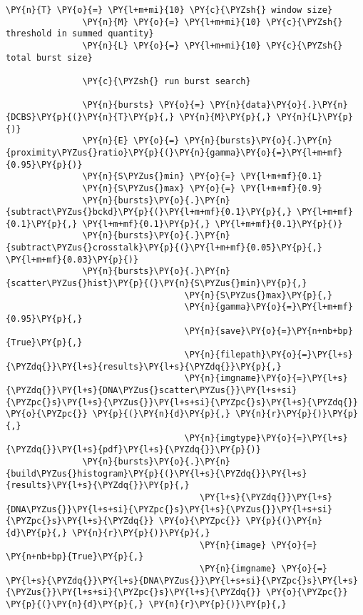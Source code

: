 \begin{Verbatim}[commandchars=\\\{\}, fontsize=\scriptsize]
               \PY{n}{T} \PY{o}{=} \PY{l+m+mi}{10} \PY{c}{\PYZsh{} window size}
               \PY{n}{M} \PY{o}{=} \PY{l+m+mi}{10} \PY{c}{\PYZsh{} threshold in summed quantity}
               \PY{n}{L} \PY{o}{=} \PY{l+m+mi}{10} \PY{c}{\PYZsh{} total burst size}
                   
               \PY{c}{\PYZsh{} run burst search}
       
               \PY{n}{bursts} \PY{o}{=} \PY{n}{data}\PY{o}{.}\PY{n}{DCBS}\PY{p}{(}\PY{n}{T}\PY{p}{,} \PY{n}{M}\PY{p}{,} \PY{n}{L}\PY{p}{)}
               \PY{n}{E} \PY{o}{=} \PY{n}{bursts}\PY{o}{.}\PY{n}{proximity\PYZus{}ratio}\PY{p}{(}\PY{n}{gamma}\PY{o}{=}\PY{l+m+mf}{0.95}\PY{p}{)}
               \PY{n}{S\PYZus{}min} \PY{o}{=} \PY{l+m+mf}{0.1}
               \PY{n}{S\PYZus{}max} \PY{o}{=} \PY{l+m+mf}{0.9}
               \PY{n}{bursts}\PY{o}{.}\PY{n}{subtract\PYZus{}bckd}\PY{p}{(}\PY{l+m+mf}{0.1}\PY{p}{,} \PY{l+m+mf}{0.1}\PY{p}{,} \PY{l+m+mf}{0.1}\PY{p}{,} \PY{l+m+mf}{0.1}\PY{p}{)}
               \PY{n}{bursts}\PY{o}{.}\PY{n}{subtract\PYZus{}crosstalk}\PY{p}{(}\PY{l+m+mf}{0.05}\PY{p}{,} \PY{l+m+mf}{0.03}\PY{p}{)}
               \PY{n}{bursts}\PY{o}{.}\PY{n}{scatter\PYZus{}hist}\PY{p}{(}\PY{n}{S\PYZus{}min}\PY{p}{,} 
                                   \PY{n}{S\PYZus{}max}\PY{p}{,} 
                                   \PY{n}{gamma}\PY{o}{=}\PY{l+m+mf}{0.95}\PY{p}{,} 
                                   \PY{n}{save}\PY{o}{=}\PY{n+nb+bp}{True}\PY{p}{,} 
                                   \PY{n}{filepath}\PY{o}{=}\PY{l+s}{\PYZdq{}}\PY{l+s}{results}\PY{l+s}{\PYZdq{}}\PY{p}{,} 
                                   \PY{n}{imgname}\PY{o}{=}\PY{l+s}{\PYZdq{}}\PY{l+s}{DNA\PYZus{}scatter\PYZus{}}\PY{l+s+si}{\PYZpc{}s}\PY{l+s}{\PYZus{}}\PY{l+s+si}{\PYZpc{}s}\PY{l+s}{\PYZdq{}} \PY{o}{\PYZpc{}} \PY{p}{(}\PY{n}{d}\PY{p}{,} \PY{n}{r}\PY{p}{)}\PY{p}{,} 
                                   \PY{n}{imgtype}\PY{o}{=}\PY{l+s}{\PYZdq{}}\PY{l+s}{pdf}\PY{l+s}{\PYZdq{}}\PY{p}{)}
               \PY{n}{bursts}\PY{o}{.}\PY{n}{build\PYZus{}histogram}\PY{p}{(}\PY{l+s}{\PYZdq{}}\PY{l+s}{results}\PY{l+s}{\PYZdq{}}\PY{p}{,}
                                      \PY{l+s}{\PYZdq{}}\PY{l+s}{DNA\PYZus{}}\PY{l+s+si}{\PYZpc{}s}\PY{l+s}{\PYZus{}}\PY{l+s+si}{\PYZpc{}s}\PY{l+s}{\PYZdq{}} \PY{o}{\PYZpc{}} \PY{p}{(}\PY{n}{d}\PY{p}{,} \PY{n}{r}\PY{p}{)}\PY{p}{,} 
                                      \PY{n}{image} \PY{o}{=} \PY{n+nb+bp}{True}\PY{p}{,} 
                                      \PY{n}{imgname} \PY{o}{=} \PY{l+s}{\PYZdq{}}\PY{l+s}{DNA\PYZus{}}\PY{l+s+si}{\PYZpc{}s}\PY{l+s}{\PYZus{}}\PY{l+s+si}{\PYZpc{}s}\PY{l+s}{\PYZdq{}} \PY{o}{\PYZpc{}} \PY{p}{(}\PY{n}{d}\PY{p}{,} \PY{n}{r}\PY{p}{)}\PY{p}{,} 

\end{Verbatim}
